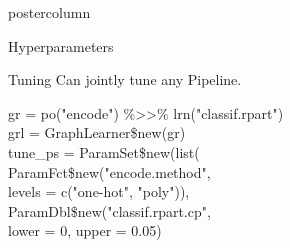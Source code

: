 \documentclass{beamer}
\newcommand{\codeinline}[1]{\begin{codeboxinline}#1\end{codeboxinline}}
\begin{document}
\begin{frame}[fragile]{}
\begin{columns}
\begin{column}{.245\textwidth}
\begin{beamercolorbox}[center]{postercolumn}
\begin{minipage}{.98\textwidth}
{\begin{myblock}{Hyperparameters}
            \end{myblock}
            \vspace{-1.0em}
            \begin{myblock}{Tuning}
              Can jointly tune any Pipeline.
              \\
              \begin{codeboxexample}
                {\footnotesize
                gr = po("encode") \%>{}>\% lrn("classif.rpart")\\
                grl = GraphLearner\$new(gr)\\
                tune\_ps = ParamSet\$new(list(\\
                \hspace*{1ex} ParamFct\$new("encode.method",\\
                \hspace*{3ex} levels = c("one-hot", "poly")),\\
                \hspace*{1ex} ParamDbl\$new("classif.rpart.cp",\\
                \hspace*{3ex} lower = 0, upper = 0.05)\\
}
\end{codeboxexample}
\end{myblock}}
\end{minipage}
\end{beamercolorbox}
\end{column}
\end{columns}
\end{frame}
\end{document}

